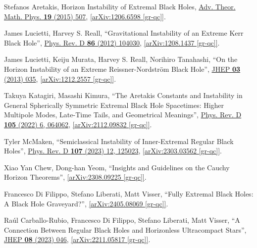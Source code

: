\documentclass[preprintnumbers, floatfix, preprintnumbers, letterpaper, twocolumn, superscriptaddress,nofootinbib]{revtex4-2}
\begin{document}
\begin{thebibliography}{99}
Stefanos Aretakis, Horizon Instability of Extremal Black Holes, {\hypersetup{urlcolor=vividviolet}\href{https://www.intlpress.com/site/pub/pages/journals/items/atmp/content/vols/0019/0003/a001/}{Adv. Theor. Math. Phys. \textbf{19} (2015) 507}}, \href{https://arxiv.org/abs/1206.6598}{[arXiv:1206.6598 [gr-qc]]}.

James Lucietti, Harvey S. Reall, ``Gravitational Instability of an Extreme Kerr Black Hole'', {\hypersetup{urlcolor=vividviolet}\href{https://journals.aps.org/prd/abstract/10.1103/PhysRevD.86.104030}{Phys. Rev. D \textbf{86} (2012) 104030}}, \href{https://arxiv.org/abs/1208.1437}{[arXiv:1208.1437 [gr-qc]]}.

James Lucietti, Keiju Murata, Harvey S. Reall, Norihiro Tanahashi, ``On the Horizon Instability of an Extreme Reissner-Nordström Black Hole'', {\hypersetup{urlcolor=vividviolet}\href{https://link.springer.com/article/10.1007/JHEP03(2013)035}{JHEP \textbf{03} (2013) 035}}, \href{https://arxiv.org/abs/1212.2557}{[arXiv:1212.2557 [gr-qc]]}. 

Takuya Katagiri, Masashi Kimura, ``The Aretakis Constants and Instability in General Spherically Symmetric Extremal Black Hole Spacetimes: Higher Multipole Modes, Late-Time Tails, and Geometrical Meanings'', {\hypersetup{urlcolor=vividviolet}\href{https://journals.aps.org/prd/abstract/10.1103/PhysRevD.105.064062}{Phys. Rev. D \textbf{105} (2022) 6, 064062}}, \href{https://arxiv.org/abs/2112.09832}{[arXiv:2112.09832 [gr-qc]]}.

Tyler McMaken, ``Semiclassical Instability of Inner-Extremal Regular Black Holes'', {\hypersetup{urlcolor=vividviolet}\href{https://journals.aps.org/prd/abstract/10.1103/PhysRevD.107.125023}{Phys. Rev. D \textbf{107} (2023) 12, 125023}}, \href{https://arxiv.org/abs/2303.03562}{[arXiv:2303.03562 [gr-qc]]}.

Xiao Yan Chew, Dong-han Yeom, ``Insights and Guidelines on the Cauchy Horizon Theorems'', \href{https://arxiv.org/abs/2308.09225}{[arXiv:2308.09225 [gr-qc]]}.

Francesco Di Filippo, Stefano Liberati, Matt Visser, ``Fully Extremal Black Holes: A Black Hole Graveyard?'', \href{https://arxiv.org/abs/2405.08069}{[arXiv:2405.08069 [gr-qc]]}.

Raúl Carballo-Rubio, Francesco Di Filippo, Stefano Liberati, Matt Visser, ``A Connection Between Regular Black Holes and Horizonless Ultracompact Stars'', {\hypersetup{urlcolor=vividviolet}\href{https://link.springer.com/article/10.1007/JHEP08(2023)046}{JHEP \textbf{08} (2023) 046}}, \href{https://arxiv.org/abs/2211.05817}{[arXiv:2211.05817 [gr-qc]]}.


\end{thebibliography}
\end{document}
